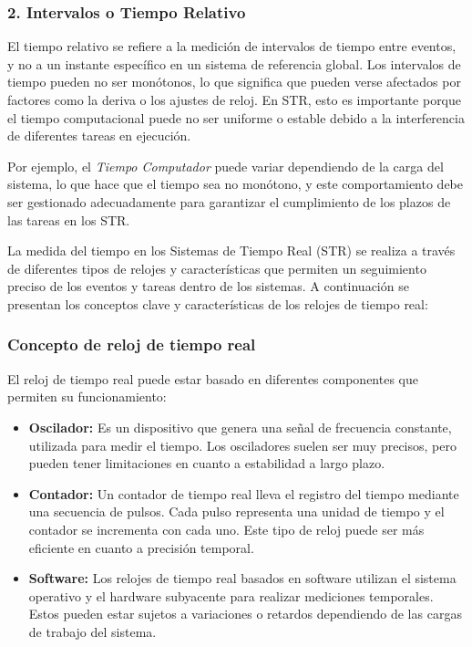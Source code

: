 \documentclass[a4paper,12pt]{article}
\begin{document}
\subsubsection{2. Intervalos o Tiempo Relativo}
El tiempo relativo se refiere a la medición de intervalos de tiempo entre eventos, y no a un instante específico en un sistema de referencia global. Los intervalos de tiempo pueden no ser monótonos, lo que significa que pueden verse afectados por factores como la deriva o los ajustes de reloj. En STR, esto es importante porque el tiempo computacional puede no ser uniforme o estable debido a la interferencia de diferentes tareas en ejecución.

Por ejemplo, el \textit{Tiempo Computador} puede variar dependiendo de la carga del sistema, lo que hace que el tiempo sea no monótono, y este comportamiento debe ser gestionado adecuadamente para garantizar el cumplimiento de los plazos de las tareas en los STR.





La medida del tiempo en los Sistemas de Tiempo Real (STR) se realiza a través de diferentes tipos de relojes y características que permiten un seguimiento preciso de los eventos y tareas dentro de los sistemas. A continuación se presentan los conceptos clave y características de los relojes de tiempo real:

\subsubsection{Concepto de reloj de tiempo real}
El reloj de tiempo real puede estar basado en diferentes componentes que permiten su funcionamiento:

\begin{itemize}
    \item \textbf{Oscilador:} Es un dispositivo que genera una señal de frecuencia constante, utilizada para medir el tiempo. Los osciladores suelen ser muy precisos, pero pueden tener limitaciones en cuanto a estabilidad a largo plazo.
    \item \textbf{Contador:} Un contador de tiempo real lleva el registro del tiempo mediante una secuencia de pulsos. Cada pulso representa una unidad de tiempo y el contador se incrementa con cada uno. Este tipo de reloj puede ser más eficiente en cuanto a precisión temporal.
    \item \textbf{Software:} Los relojes de tiempo real basados en software utilizan el sistema operativo y el hardware subyacente para realizar mediciones temporales. Estos pueden estar sujetos a variaciones o retardos dependiendo de las cargas de trabajo del sistema.
\end{itemize}
\end{document}
